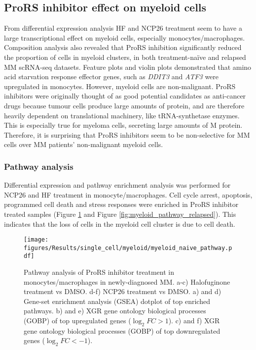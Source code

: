 \subsection{ProRS inhibitor effect on myeloid cells}
From differential expression analysis HF and NCP26 treatment seem to have a large transcriptional effect on myeloid cells, especially monocytes/macrophages.
Composition analysis also revealed that ProRS inhibition significantly reduced the proportion of cells in myeloid clusters, in both treatment-na\"ive and relapsed MM scRNA-seq datasets.
Feature plots and violin plots demonstrated that amino acid starvation response effector genes, such as \textit{DDIT3} and \textit{ATF3} were upregulated in monocytes.
However, myeloid cells are non-malignant.
ProRS inhibitors were originally thought of as good potential candidates as anti-cancer drugs because tumour cells produce large amounts of protein, and are therefore heavily dependent on translational machinery, like tRNA-synthetase enzymes.
This is especially true for myeloma cells, secreting large amounts of M protein.
Therefore, it is surprising that ProRS inhibitors seem to be non-selective for MM cells over MM patients' non-malignant myeloid cells.


\subsubsection{Pathway analysis}
Differential expression and pathway enrichment analysis was performed for NCP26 and HF treatment in monocyte/macrophages.
Cell cycle arrest, apoptosis, programmed cell death and stress responses were enriched in ProRS inhibitor treated samples (Figure \ref{fig:myeloid_pathway_naive} and Figure \ref{fig:myeloid_pathway_relapsed}).
This indicates that the loss of cells in the myeloid cell cluster is due to cell death.
\begin{figure}[htb]
\centering
\texttt{[image: figures/Results/single\_cell/myeloid/myeloid\_naive\_pathway.pdf]}
\caption[Myeloid cell pathway analysis- newly diagnosed MM]{Pathway analysis of ProRS inhibitor treatment in monocytes/macrophages in newly-diagnosed MM.
a-c) Halofuginone treatment vs DMSO.
d-f) NCP26 treatment vs DMSO.
a) and d) Gene-set enrichment analysis (GSEA) dotplot of top enriched pathways.
b) and e) XGR gene ontology biological processes (GOBP) of top upregulated genes ($\log_{2}FC >1$).
c) and f) XGR gene ontology biological processes (GOBP) of top downregulated genes ($\log_{2}FC < -1$).
}
\label{fig:myeloid_pathway_naive}
\end{figure}

